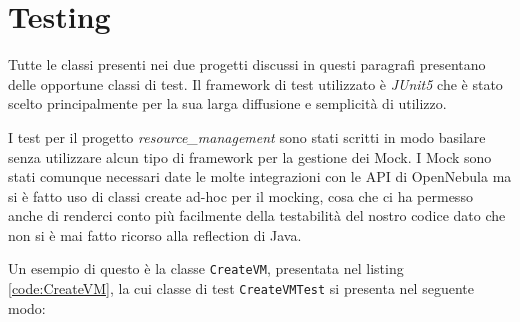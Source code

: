\section{Testing}
Tutte le classi presenti nei due progetti discussi in questi paragrafi presentano delle opportune classi di test. Il framework di test utilizzato è \emph{JUnit5}\cite{junit5} che è stato scelto principalmente per la sua larga diffusione e semplicità di utilizzo.\par
I test per il progetto \emph{resource\_management} sono stati scritti in modo basilare senza utilizzare alcun tipo di framework per la gestione dei Mock. I Mock sono stati comunque necessari date le molte integrazioni con le API di OpenNebula ma si è fatto uso di classi create ad-hoc per il mocking, cosa che ci ha permesso anche di renderci conto più facilmente della testabilità del nostro codice dato che non si è mai fatto ricorso alla reflection di Java.\par
Un esempio di questo è la classe \texttt{CreateVM}, presentata nel listing \ref{code:CreateVM}, la cui classe di test \texttt{CreateVMTest} si presenta nel seguente modo:
